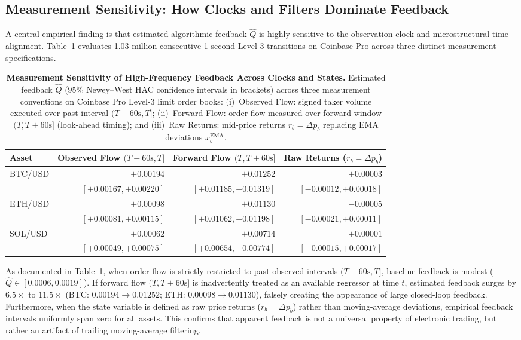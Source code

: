 \documentclass[12pt]{article}
\theoremstyle{definition}
\theoremstyle{remark}
\begin{document}
\subsection{Measurement Sensitivity: How Clocks and Filters Dominate Feedback}
\label{sec:measurement_sensitivity}
A central empirical finding is that estimated algorithmic feedback $\hat{Q}$ is highly sensitive to the observation clock and microstructural time alignment. Table~\ref{tab:measurement_sensitivity} evaluates 1.03 million consecutive 1-second Level-3 transitions on Coinbase Pro across three distinct measurement specifications.

\begin{table}[htbp]
\centering\footnotesize
\setlength{\tabcolsep}{4pt}
\caption{\textbf{Measurement Sensitivity of High-Frequency Feedback Across Clocks and States.}
Estimated feedback $\hat{Q}$ (95\% Newey--West HAC confidence intervals in brackets) across three measurement conventions on Coinbase Pro Level-3 limit order books: (i)~Observed Flow: signed taker volume executed over past interval $(T-60\text{s}, T]$; (ii)~Forward Flow: order flow measured over forward window $(T, T+60\text{s}]$ (look-ahead timing); and (iii)~Raw Returns: mid-price returns $r_b = \Delta p_b$ replacing EMA deviations $x_b^{\text{EMA}}$.}
\label{tab:measurement_sensitivity}
\begin{tabular}{lrrr}\toprule
Asset & Observed Flow $(T-60\text{s}, T]$ & Forward Flow $(T, T+60\text{s}]$ & Raw Returns ($r_b = \Delta p_b$) \\\midrule
BTC/USD & $+0.00194$ & $+0.01252$ & $+0.00003$ \\
        & $[+0.00167, +0.00220]$ & $[+0.01185, +0.01319]$ & $[-0.00012, +0.00018]$ \\
ETH/USD & $+0.00098$ & $+0.01130$ & $-0.00005$ \\
        & $[+0.00081, +0.00115]$ & $[+0.01062, +0.01198]$ & $[-0.00021, +0.00011]$ \\
SOL/USD & $+0.00062$ & $+0.00714$ & $+0.00001$ \\
        & $[+0.00049, +0.00075]$ & $[+0.00654, +0.00774]$ & $[-0.00015, +0.00017]$ \\\bottomrule
\end{tabular}
\end{table}

As documented in Table~\ref{tab:measurement_sensitivity}, when order flow is strictly restricted to past observed intervals $(T-60\text{s}, T]$, baseline feedback is modest ($\hat{Q} \in [0.0006, 0.0019]$). If forward flow $(T, T+60\text{s}]$ is inadvertently treated as an available regressor at time $t$, estimated feedback surges by $6.5\times$ to $11.5\times$ (BTC: $0.00194 \to 0.01252$; ETH: $0.00098 \to 0.01130$), falsely creating the appearance of large closed-loop feedback. Furthermore, when the state variable is defined as raw price returns ($r_b = \Delta p_b$) rather than moving-average deviations, empirical feedback intervals uniformly span zero for all assets. This confirms that apparent feedback is not a universal property of electronic trading, but rather an artifact of trailing moving-average filtering.
\end{document}
